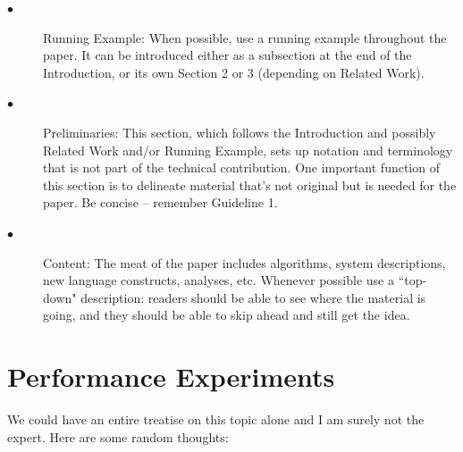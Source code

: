 \documentclass[10pt,twocolumn]{article}
\begin{document}
\begin{description}
  \item[$\bullet$]  Running Example: When possible, use a running example throughout the paper. It can be introduced either as a subsection at the end of the Introduction, or its own Section 2 or 3 (depending on Related Work).
  \item[$\bullet$]  Preliminaries: This section, which follows the Introduction and possibly Related Work and/or Running Example, sets up notation and terminology that is not part of the technical contribution. One important function of this section is to delineate material that's not original but is needed for the paper. Be concise -- remember Guideline 1.
    \item[$\bullet$] Content: The meat of the paper includes algorithms, system descriptions, new language constructs, analyses, etc. Whenever possible use a ``top-down" description: readers should be able to see where the material is going, and they should be able to skip ahead and still get the idea.
\end{description}


\section{Performance Experiments}

We could have an entire treatise on this topic alone and I am surely not the expert. Here are some random thoughts:
\end{document}
